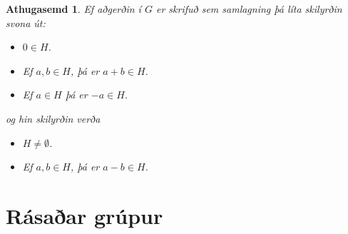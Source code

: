\documentclass[a4paper,icelandic,11pt]{book}
\theoremstyle{plain}
\newtheorem*{ath}{Athugasemd}
\begin{document}
\begin{ath}
  Ef aðgerðin í $G$ er skrifuð sem samlagning þá líta skilyrðin svona út:
  \begin{itemize}
    \item [(i)] $0\in H$.
    \item [(ii)] Ef $a,b\in H$, þá er $a+b\in H$.
    \item [(iii)] Ef $a\in H$ þá er $-a\in H$.
  \end{itemize}
  og hin skilyrðin verða
  \begin{itemize}
    \item [(i')] $H\neq \emptyset$.
    \item [(ii')] Ef $a,b\in H$, þá er $a-b\in H$.
  \end{itemize}
\end{ath}

\section{Rásaðar grúpur}
\end{document}
